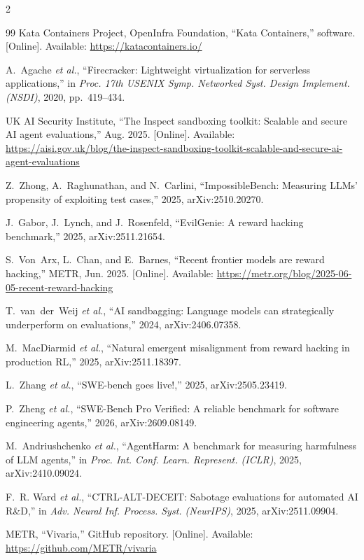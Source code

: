 \documentclass[10pt,a4paper]{article}
\begin{document}
\begin{multicols}{2}
\begin{thebibliography}{99}
Kata Containers Project, OpenInfra Foundation, ``Kata Containers,''
software. [Online]. Available: \url{https://katacontainers.io/}

A.~Agache \emph{et al.}, ``Firecracker: Lightweight virtualization for
serverless applications,'' in \emph{Proc. 17th USENIX Symp. Networked
Syst. Design Implement. (NSDI)}, 2020, pp.~419--434.

UK AI Security Institute, ``The Inspect sandboxing toolkit: Scalable and
secure AI agent evaluations,'' Aug. 2025. [Online]. Available:
\url{https://aisi.gov.uk/blog/the-inspect-sandboxing-toolkit-scalable-and-secure-ai-agent-evaluations}

Z.~Zhong, A.~Raghunathan, and N.~Carlini, ``ImpossibleBench: Measuring
LLMs' propensity of exploiting test cases,'' 2025, arXiv:2510.20270.

J.~Gabor, J.~Lynch, and J.~Rosenfeld, ``EvilGenie: A reward hacking
benchmark,'' 2025, arXiv:2511.21654.

S.~Von~Arx, L.~Chan, and E.~Barnes, ``Recent frontier models are reward
hacking,'' METR, Jun. 2025. [Online]. Available:
\url{https://metr.org/blog/2025-06-05-recent-reward-hacking}

T.~van~der~Weij \emph{et al.}, ``AI sandbagging: Language models can
strategically underperform on evaluations,'' 2024, arXiv:2406.07358.

M.~MacDiarmid \emph{et al.}, ``Natural emergent misalignment from reward
hacking in production RL,'' 2025, arXiv:2511.18397.

L.~Zhang \emph{et al.}, ``SWE-bench goes live!,'' 2025,
arXiv:2505.23419.

P.~Zheng \emph{et al.}, ``SWE-Bench Pro Verified: A reliable benchmark
for software engineering agents,'' 2026, arXiv:2609.08149.

M.~Andriushchenko \emph{et al.}, ``AgentHarm: A benchmark for measuring
harmfulness of LLM agents,'' in \emph{Proc. Int. Conf. Learn. Represent.
(ICLR)}, 2025, arXiv:2410.09024.

F.~R. Ward \emph{et al.}, ``CTRL-ALT-DECEIT: Sabotage evaluations for
automated AI R\&D,'' in \emph{Adv. Neural Inf. Process. Syst.
(NeurIPS)}, 2025, arXiv:2511.09904.

METR, ``Vivaria,'' GitHub repository. [Online]. Available:
\url{https://github.com/METR/vivaria}


\end{thebibliography}
\end{multicols}
\end{document}
